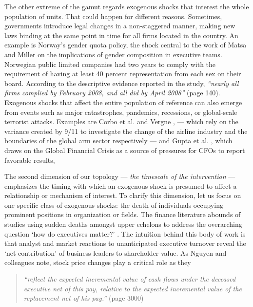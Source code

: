 \documentclass[11pt]{article}
\begin{document}
\begin{refsection}
The other extreme of the gamut regards exogenous shocks that interest the whole
population of units. That could happen for different reasons. Sometimes,
governments introduce legal changes in a non-staggered manner, making new laws
binding at the same point in time for all firms located in the country.  An
example is Norway's gender quota policy, the shock central to the work of Matsa
and Miller \autocite*{matsa_miller_2013} on the implications of gender
composition in executive teams. Norwegian public limited companies had two years to comply
with the requirement of having at least 40 percent representation from each sex
on their board. According to the descriptive evidence reported in the study,
\textit{``nearly all firms complied by February 2008, and all did by April
2008''} (page 140). Exogenous shocks that affect the entire population of
reference can also emerge from events such as major catastrophes, pandemics,
recessions, or global-scale terrorist attacks. Examples are Corbo et al.
\autocite*{corbo2016323} and Vergne \autocite*{vergne20121027},
--- which rely on the variance created by 9/11 to investigate the change
of the airline industry and the boundaries of the global arm sector respectively
--- and Gupta et al. \autocite*{gupta2020802}, which draws on the Global 
Financial Crisis as a source of pressures for CFOs to report favorable results,

The second dimension of our topology --- \textit{the timescale of the intervention} --- emphasizes
the timing with which an exogenous shock is presumed to affect a relationship or
mechanism of interest. To clarify this dimension, let us focus on one specific
class of exogenous shocks: the death of individuals occupying prominent
positions in organization or fields. The finance literature abounds of studies
using sudden deaths amongst upper echelons to address the overarching question
`how do executives matter?'
\autocites[e.g.,][]{johnson_et_al_1985,nguyen_et_al_2014,nguyen_et_al_2010,
faccio_parsley_2009,salas_2010,fracassi_tate_2012,fee_et_al_2013,cho_et_al_2016,
dedman_et_al_2002,duchin_sosyura_2013,falato_et_al_2014}.
The intuition behind this body of work is that analyst and market reactions
to unanticipated executive turnover reveal the `net contribution'
of business leaders to shareholder value. As Nguyen 
and colleagues \autocite*[][]{nguyen_et_al_2014} note, stock price changes 
play a critical role as they

\begin{quote}
  \textit{
    ``reflect the expected incremental value of cash flows under the deceased
    executive net of this pay, relative to the expected incremental value of the
    replacement net of his pay.''
  }
  (page 3000)
\end{quote}


\end{refsection}
\end{document}
